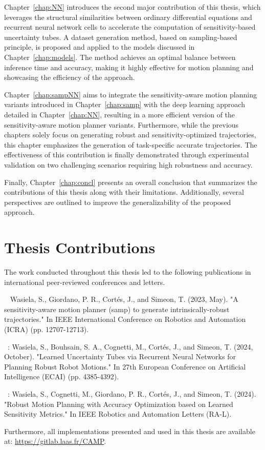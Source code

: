 Chapter~\ref{chap:NN} introduces the second major contribution of this thesis, which leverages the structural similarities between ordinary differential equations and recurrent neural network cells to accelerate the computation of sensitivity-based uncertainty tubes. 
A dataset generation method, based on sampling-based principle, is proposed and applied to the models discussed in Chapter~\ref{chap:models}. 
The method achieves an optimal balance between inference time and accuracy, making it highly effective for motion planning and showcasing the efficiency of the approach.

Chapter~\ref{chap:sampNN} aims to integrate the sensitivity-aware motion planning variants introduced in Chapter~\ref{chap:samp} with the deep learning approach detailed in Chapter~\ref{chap:NN}, resulting in a more efficient version of the sensitivity-aware motion planner variants.
Furthermore, while the previous chapters solely focus on generating robust and sensitivity-optimized trajectories, this chapter emphasizes the generation of task-specific accurate trajectories.
The effectiveness of this contribution is finally demonstrated through experimental validation on two challenging scenarios requiring high robustness and accuracy.

Finally, Chapter~\ref{chap:concl} presents an overall conclusion that summarizes the contributions of this thesis along with their limitations.
Additionally, several perspectives are outlined to improve the generalizability of the proposed approach.

\section{Thesis Contributions}

The work conducted throughout this thesis led to the following publications in international peer-reviewed conferences and letters. 

~\cite{cSAMP} Wasiela, S., Giordano, P. R., Cortés, J., and Simeon, T. (2023, May). "A sensitivity-aware motion planner (samp) to generate intrinsically-robust trajectories." In IEEE International Conference on Robotics and Automation (ICRA) (pp. 12707-12713).

~\cite{cECAI}: Wasiela, S., Bouhsain, S. A., Cognetti, M., Cortés, J., and Simeon, T. (2024, October). "Learned Uncertainty Tubes via Recurrent Neural Networks for Planning Robust Robot Motions." In 27th European Conference on Artificial Intelligence (ECAI) (pp. 4385-4392).

~\cite{cRAL}: Wasiela, S., Cognetti, M., Giordano, P. R., Cortés, J., and Simeon, T. (2024). "Robust Motion Planning with Accuracy Optimization based on Learned Sensitivity Metrics." In IEEE Robotics and Automation Letters (RA-L).

Furthermore, all implementations presented and used in this thesis are available at: \href{https://gitlab.laas.fr/CAMP}{https://gitlab.laas.fr/CAMP}.